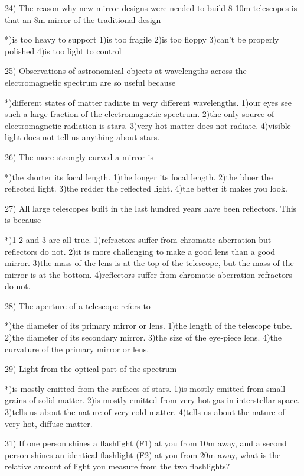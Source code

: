 24) The reason why new mirror designs were needed to build 8-10m 
    telescopes is that an 8m mirror of the traditional design
 
 *)is too heavy to support
 1)is too fragile
 2)is too floppy
 3)can't be properly polished
 4)is too light to control
 
25) Observations of astronomical objects at wavelengths across the
    electromagnetic spectrum are so useful because
 
 *)different states of matter radiate in very different wavelengths.
 1)our eyes see such a large fraction of the electromagnetic spectrum.
 2)the only source of electromagnetic radiation is stars.
 3)very hot matter does not radiate.
 4)visible light does not tell us anything about stars.
 
26) The more strongly curved a mirror is
 
 *)the shorter its focal length.
 1)the longer its focal length.
 2)the bluer the reflected light.
 3)the redder the reflected light.
 4)the better it makes you look.
 
27) All large telescopes built in the last hundred years have been
    reflectors.  This is because
 
 *)1 2 and 3 are all true.
 1)refractors suffer from chromatic aberration but reflectors do not.
 2)it is more challenging to make a good lens than a good mirror.
 3)the mass of the lens is at the top of the telescope, but the mass of
   the mirror is at the bottom.
 4)reflectors suffer from chromatic aberration refractors do not.
 
28) The aperture of a telescope refers to 
 
 *)the diameter of its primary mirror or lens.
 1)the length of the telescope tube.
 2)the diameter of its secondary mirror.
 3)the size of the eye-piece lens.
 4)the curvature of the primary mirror or lens.
 
29) Light from the optical part of the spectrum 
 
 *)is mostly emitted from the surfaces of stars.
 1)is mostly emitted from small grains of solid matter.
 2)is mostly emitted from very hot gas in interstellar space.
 3)tells us about the nature of very cold matter.
 4)tells us about the nature of very hot, diffuse matter.
 
31) If one person shines a flashlight (F1) at you from 10m away, and a
    second person shines an identical flashlight (F2) at you from 20m
    away, what is the relative amount of light you measure from the two
    flashlights?
 
